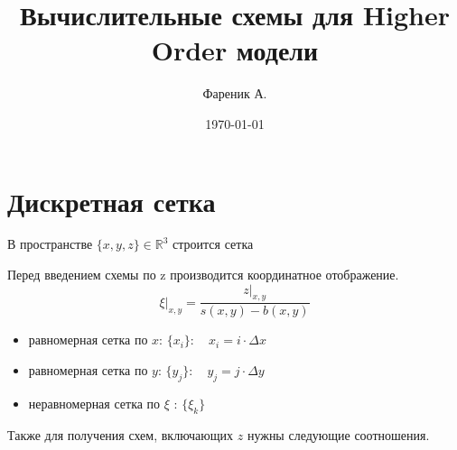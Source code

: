 \documentclass[12pt, a4paper]{article}
\title{Вычислительные схемы для Higher Order модели}
\author{Фареник А.}
\date{\today}
\begin{document}
\maketitle

\section*{Дискретная сетка}

В пространстве $ \{ x,y,z \} \in \mathbb{R}^3 $ строится сетка

Перед введением схемы по z производится координатное отображение.
\begin{equation*}
    \left.
        \xi
    \right|_{x, y}
    =
    \frac
        {
            \left.
                z
            \right|_{x, y}
        }
        {s(x, y) - b(x, y)}
\end{equation*}

\begin{itemize}
    \item равномерная сетка по $ x $: $ \{ x_i \} : \quad x_i = i \cdot \Delta x $
    \item равномерная сетка по $ y $: $ \{ y_j \} : \quad y_j = j \cdot \Delta y $
    \item неравномерная сетка по $ \xi $ : $ \{ \xi_k \} $
\end{itemize}

Также для получения схем, включающих $ z $ нужны следующие соотношения.
\end{document}

